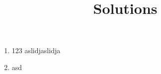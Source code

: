 \documentclass{article}
\begin{document}


\section*{}
\title{Solutions}
\begin{enumerate}
        \item 123
aslidjaslidja
        \item asd

\end{enumerate}
\end{document}
